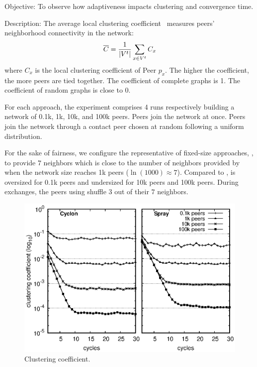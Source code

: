 \begin{asparadesc}
\item[Objective:] To observe how adaptiveness impacts clustering and convergence
  time.
\item[Description:] The average local clustering
  coefficient~\cite{watts1998collective} measures peers' neighborhood
  connectivity in the network:
  \begin{equation*}
    \overline{C} = {1\over |V^t|}\sum\limits_{x\in V^t}C_x
  \end{equation*}
  where $C_x$ is the local clustering coefficient of Peer $p_x$. The higher the
  coefficient, the more peers are tied together. The coefficient of complete
  graphs is 1. The coefficient of random graphs is close to 0.  

  For each approach, the experiment comprises 4 runs respectively building a
  network of 0.1k, 1k, 10k, and 100k peers. Peers join the network at
  once. Peers join the network through a contact peer chosen at random following
  a uniform distribution. 
  
  For the sake of fairness, we configure the representative of
  fixed-size approaches, \CYCLON, to provide $7$ neighbors which is
  close to the number of neighbors provided by \SPRAY when the network
  size reaches 1k peers ($\ln(1000)\approx 7$). Compared to \SPRAY,
  \CYCLON is oversized for 0.1k peers and undersized for 10k peers and
  100k peers. During exchanges, the peers using \CYCLON shuffle $3$
  out of their $7$ neighbors.


\begin{figure}
  \centering
  \includegraphics[width=\SCALE\textwidth]{img/clustering.eps}
  \caption{\label{fig:clustering}Clustering coefficient.}
\end{figure}


\end{asparadesc}
